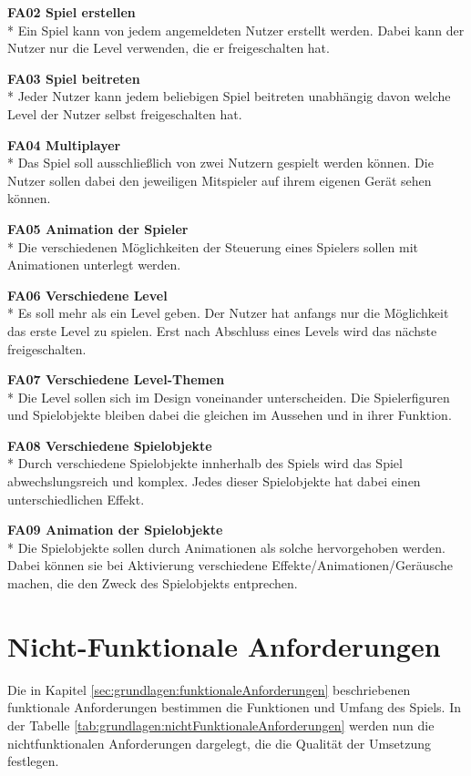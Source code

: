 \textbf{FA02 Spiel erstellen}\\*
Ein Spiel kann von jedem angemeldeten Nutzer erstellt werden. Dabei kann der Nutzer nur die Level verwenden, die er freigeschalten hat.

\textbf{FA03 Spiel beitreten}\\*
Jeder Nutzer kann jedem beliebigen Spiel beitreten unabhängig davon welche Level der Nutzer selbst freigeschalten hat.

\textbf{FA04 Multiplayer}\\*
Das Spiel soll ausschließlich von zwei Nutzern gespielt werden können. Die Nutzer sollen dabei den jeweiligen Mitspieler auf ihrem eigenen Gerät sehen können.

\textbf{FA05 Animation der Spieler}\\*
Die verschiedenen Möglichkeiten der Steuerung eines Spielers sollen mit Animationen unterlegt werden. 

\textbf{FA06 Verschiedene Level}\\*
Es soll mehr als ein Level geben. Der Nutzer hat anfangs nur die Möglichkeit das erste Level zu spielen. Erst nach Abschluss eines Levels wird das nächste freigeschalten.

\textbf{FA07 Verschiedene Level-Themen}\\*
Die Level sollen sich im Design voneinander unterscheiden. Die Spielerfiguren und Spielobjekte bleiben dabei die gleichen im Aussehen und in ihrer Funktion.

\textbf{FA08 Verschiedene Spielobjekte}\\*
Durch verschiedene Spielobjekte innherhalb des Spiels wird das Spiel abwechslungsreich und komplex. Jedes dieser Spielobjekte hat dabei einen unterschiedlichen Effekt.

\textbf{FA09 Animation der Spielobjekte}\\*
Die Spielobjekte sollen durch Animationen als solche hervorgehoben werden. Dabei können sie bei Aktivierung verschiedene Effekte/Animationen/Geräusche machen, die den Zweck des Spielobjekts entprechen.


\section{Nicht-Funktionale Anforderungen}
\label{sec:grundlagen:nichtFunktionaleAnforderungen}
Die in Kapitel \ref{sec:grundlagen:funktionaleAnforderungen} beschriebenen funktionale Anforderungen bestimmen die Funktionen und Umfang des Spiels. In der Tabelle \ref{tab:grundlagen:nichtFunktionaleAnforderungen} werden nun die nichtfunktionalen Anforderungen dargelegt, die die Qualität der Umsetzung festlegen.

